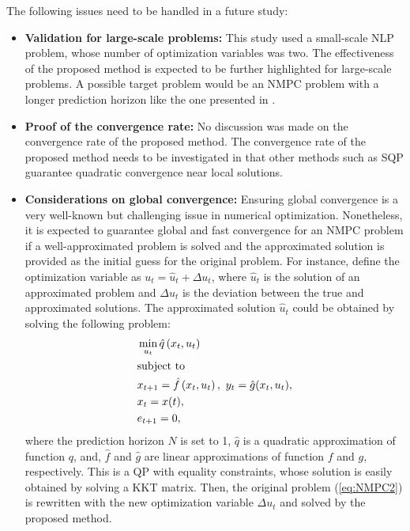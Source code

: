 \documentclass[journal]{IEEEtranTIE}
\begin{document}
The following issues need to be handled in a future study:
\begin{itemize}
    \item \textbf{Validation for large-scale problems:} This study used a small-scale NLP problem, whose number of optimization variables was two. The effectiveness of the proposed method is expected to be further highlighted for large-scale problems. A possible target problem would be an NMPC problem with a longer prediction horizon like the one presented in \cite{de2022system}.
    \item \textbf{Proof of the convergence rate:} No discussion was made on the convergence rate of the proposed method. The convergence rate of the proposed method needs to be investigated in that other methods such as SQP guarantee quadratic convergence near local solutions. 
    \item \textbf{Considerations on global convergence:} Ensuring global convergence is a very well-known but challenging issue in numerical optimization. Nonetheless, it is expected to guarantee global and fast convergence for an NMPC problem if a well-approximated problem is solved and the approximated solution is provided as the initial guess for the original problem. For instance, define the optimization variable as ${u_t} = {\hat u_t} + \Delta {u_t}$, where ${\hat u_t}$ is the solution of an approximated problem and $\Delta {u_t}$ is the deviation between the true and approximated solutions. The approximated solution ${\hat u_t}$ could be obtained by solving the following problem:
    \begin{subequations}\label{eq:NMPC3}
    \begin{align}
    &\mathop {\min }\limits_{{u_t}} {{\hat q}\left( {{x_{t}},{u_{t}}} \right)} \\\nonumber
    &{\rm{subject\ to}}\\
    &{x_{t + 1}} = {\hat f}\left( {{x_{t}},{u_{t}}} \right),\ {y_{t}} = {\hat g}({x_{t}},{u_{t}}),\\
    &{x_t} = x(t),\\
    &{e_{t + 1}} = 0,
    \end{align}
    \end{subequations}
    where the prediction horizon $N$ is set to 1, $\hat q$ is a quadratic approximation of function $q$, and, $\hat f$ and $\hat g$ are linear approximations of function $f$ and $g$, respectively. This is a QP with equality constraints, whose solution is easily obtained by solving a KKT matrix. Then, the original problem (\ref{eq:NMPC2}) is rewritten with the new optimization variable $\Delta {u_t}$ and solved by the proposed method.
    \end{itemize}
\end{document}
